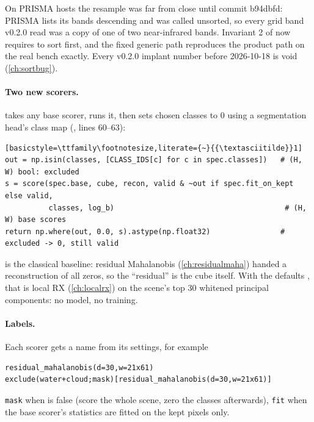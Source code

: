 \begin{sourcenote}
On PRISMA hosts the resample was far from close until commit b94dbfd: PRISMA lists its bands descending and
 was called unsorted, so every grid band v0.2.0 read was a copy of one of two near-infrared bands.
Invariant 2 of  now requires  to sort first, and the fixed generic path
reproduces the product path on the real bench exactly. Every v0.2.0 implant number before 2026-10-18 is void
(\cref{ch:sortbug}).
\end{sourcenote}

\paragraph{Two new scorers.}  takes any base scorer, runs it, then sets chosen classes to 0 using a
segmentation head's class map (, lines 60--63):
\begin{lstlisting}[basicstyle=\ttfamily\footnotesize,literate={~}{{\textasciitilde}}1]
out = np.isin(classes, [CLASS_IDS[c] for c in spec.classes])   # (H, W) bool: excluded
s = score(spec.base, cube, recon, valid & ~out if spec.fit_on_kept else valid,
          classes, log_b)                                       # (H, W) base scores
return np.where(out, 0.0, s).astype(np.float32)                # excluded -> 0, still valid
\end{lstlisting}
 is the classical baseline: residual Mahalanobis (\cref{ch:residualmaha}) handed a reconstruction of all
zeros, so the ``residual'' is the cube itself. With the defaults ,  that is
local RX (\cref{ch:localrx}) on the scene's top 30 whitened principal components: no model, no training.

\paragraph{Labels.} Each scorer gets a name from its settings, for example
\begin{lstlisting}[language={}]
residual_mahalanobis(d=30,w=21x61)
exclude(water+cloud;mask)[residual_mahalanobis(d=30,w=21x61)]
\end{lstlisting}
\texttt{mask} when  is false (score the whole scene, zero the classes afterwards), \texttt{fit} when
the base scorer's statistics are fitted on the kept pixels only.

